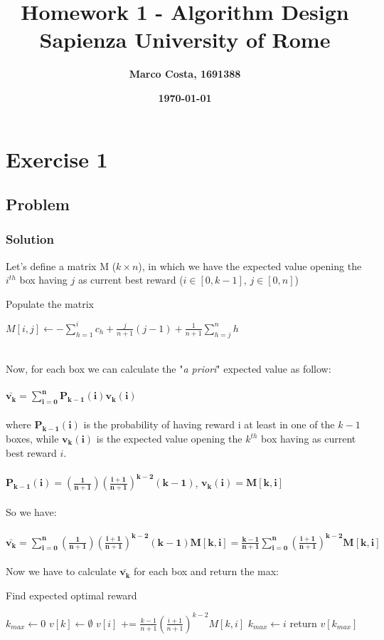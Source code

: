 \documentclass[11pt]{article}
\title{\textbf{Homework 1 - Algorithm Design} \\ \bigskip \large \textbf{Sapienza University of Rome}}
\date{\textbf{\today}}
\author{\textbf{Marco Costa, 1691388}}
\begin{document}
\maketitle
\newpage

\section*{Exercise 1}
\subsection*{Problem}
\subsubsection*{Solution}
Let's define a matrix M ($k \times n$), in which we have the expected value opening the $i^{th}$ box having $j$ as current best reward ($i \in [0, k-1]$, $j \in [0, n]$)
\begin{algorithm}
	\caption{Populate the matrix}\label{euclid}
	\begin{algorithmic}[1]
		\State $M[i,j] \gets -\sum\limits_{h=1}^i c_h + \frac{j}{n+1}(j-1) + \frac{1}{n+1}\sum\limits_{h=j}^n h$
		\EndFor		
		\EndFor
	\end{algorithmic}
\end{algorithm}\\
Now, for each box we can calculate the "\textit{a priori}" expected value as follow: \\ \\
$\mathbf{\bar{v_k} = \sum\limits_{i=0}^n P_{k-1}(i)v_k(i)}$ \\ \\
where $\mathbf{P_{k-1}(i)}$ is the probability of having reward i at least in one of the $\mathit{k-1}$ boxes, while $\mathbf{v_k(i)}$ is the expected value opening the $\mathit{k^{th}}$ box having as current best reward $\mathit{i}$. \\ \\
$\mathbf{P_{k-1}(i) = (\frac{1}{n+1})(\frac{i+1}{n+1})^{k-2}(k-1)}$, \qquad $\mathbf{v_k(i) = M[k,i]}$ \\ \\
So we have: \\ \\
$\mathbf{\bar{v_k} = \sum\limits_{i=0}^n (\frac{1}{n+1})(\frac{i+1}{n+1})^{k-2}(k-1)M[k,i] = \frac{k-1}{n+1} \sum\limits_{i=0}^n (\frac{i+1}{n+1})^{k-2}M[k,i]}$ \\ \\
Now we have to calculate $\mathbf{\bar{v_k}}$ for each box and return the max:
\begin{algorithm}
	\caption{Find expected optimal reward}\label{euclid}
	\begin{algorithmic}[1]
		\State $k_{max} \gets 0$
		\State $v[k] \gets \emptyset$
		\State $v[i]$ += $\frac{k-1}{n+1}(\frac{i+1}{n+1})^{k-2}M[k,i]$
		\EndFor
		\State $k_{max} \gets i$
		\EndIf	
		\EndFor
		\State return $v[k_{max}]$
	\end{algorithmic}
\end{algorithm}\\
\newpage
\end{document}
